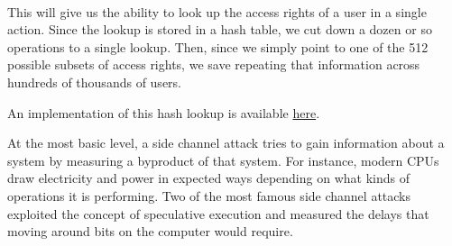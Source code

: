  \\

This will give us the ability to look up the access rights of a user in a single action. Since the lookup is stored in a hash table, we cut down a dozen or so operations to a single lookup. Then, since we simply point to one of the 512 possible subsets of access rights, we save repeating that information across hundreds of thousands of users. \\


An implementation of this hash lookup is available \href{http://github.com/andey-robins}{here}. \\


At the most basic level, a side channel attack tries to gain information about a system by measuring a byproduct of that system. For instance, modern CPUs draw electricity and power in expected ways depending on what kinds of operations it is performing. Two of the most famous side channel attacks exploited the concept of speculative execution and measured the delays that moving around bits on the computer would require. \\

